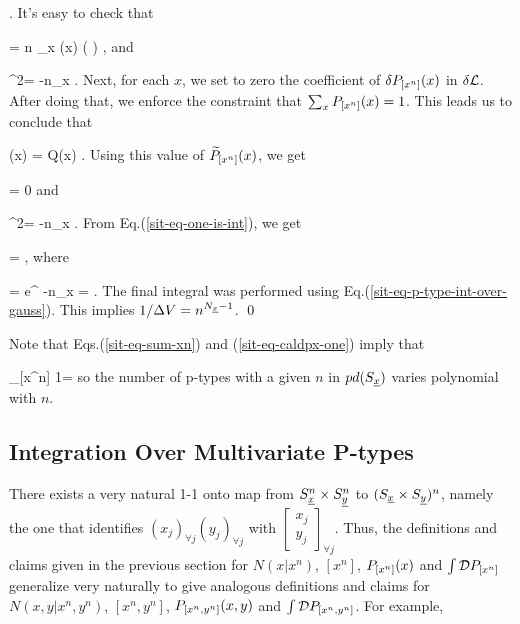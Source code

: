 \beq
\delta {}
\;.
\eeq
It's easy to check that

\beq
\delta \call=
n \sum_x \delta {}(x)\ln
\left(
\right)
\;,
\eeq
and

\beq
\delta^2\call=
-n\sum_x
\;.
\eeq
Next, for each $x$,
we set to zero
the coefficient
of
$\delta {P_{[x^n]} }(x)$
in $\delta {\cal L}$.
After doing that, we
enforce the constraint
that $\sum_x {P_{[x^n]} }(x)=1$.
This leads us to conclude that


\beq
{}(x) = Q(x)
\;.
\eeq
Using this value of
${\widetilde{P}_{[x^n]} }(x)$,
we get

\beq
\tcall = 0
\;
\eeq
and

\beq
\delta^2\tcall=
-n\sum_x
\;.
\eeq
From Eq.(\ref{sit-eq-one-is-int}),
we get

=\Gamma
\;,
\eeq
where

\beq
\Gamma =\int \cald {}
e^{
-n\sum_x
}
=
\;.
\eeq
The final integral was performed
using Eq.(\ref{sit-eq-p-type-int-over-gauss}).
This implies $1/\Delta V= n^{N_{\underline{x}}-1}$.
\qed

Note that Eqs.(\ref{sit-eq-sum-xn})
and (\ref{sit-eq-caldpx-one}) imply that

\beq
\sum_{[x^n]}
1=
\;
\eeq
so the number
of p-types
with a given $n$
in $pd(S_{\underline{x}})$
varies polynomial with $n$.


\subsection{Integration Over Multivariate P-types}

There exists
a very natural 1-1 onto map from
$S_{\underline{x}}^n\times S_{\underline{y}}^n$
to $(S_{\underline{x}}\times S_{\underline{y}})^n$,
namely the one that
identifies $(x_j)_{\forall j}(y_j)_{\forall j}$
with $\left[\begin{array}{c}x_j\\y_j
\end{array}\right]_{\forall j}$. Thus,
the definitions
and claims given in the previous
section for $N(x|x^n)$, $[x^n]$,
${P_{[x^n]} }(x)$ and
$\int {\cal D} {P_{[x^n]} }$
generalize very naturally to
give analogous definitions and claims
for
$N(x,y|x^n, y^n)$, $[x^n, y^n]$,
${P_{[x^n,y^n]} }(x,y)$ and
$\int {\cal D} {P_{[x^n,y^n]} }$.
For example,

